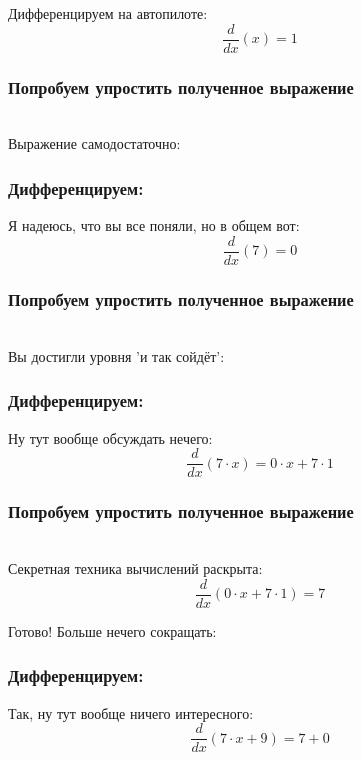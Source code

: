 \documentclass[a4paper,12pt]{article}
\begin{document}
Дифференцируем на автопилоте:
\begin{dmath}\frac{d}{dx}\left(x\right)=1\end{dmath}
\subsubsection*{Попробуем упростить полученное выражение}
\\Выражение самодостаточно:

\subsubsection*{Дифференцируем:}

Я надеюсь, что вы все поняли, но в общем вот:
\begin{dmath}\frac{d}{dx}\left(7\right)=0\end{dmath}
\subsubsection*{Попробуем упростить полученное выражение}
\\Вы достигли уровня 'и так сойдёт':

\subsubsection*{Дифференцируем:}

Ну тут вообще обсуждать нечего:
\begin{dmath}\frac{d}{dx}\left(7\cdot x\right)=0\cdot x+ 7\cdot 1\end{dmath}
\subsubsection*{Попробуем упростить полученное выражение}
\\Секретная техника вычислений раскрыта:\\
\begin{dmath}
	\frac{d}{dx}\left(0\cdot x+ 7\cdot 1\right) = 7\end{dmath}

Готово! Больше нечего сокращать:

\subsubsection*{Дифференцируем:}

Так, ну тут вообще ничего интересного:
\begin{dmath}\frac{d}{dx}\left(7\cdot x+ 9\right)=7+ 0\end{dmath}
\end{document}
